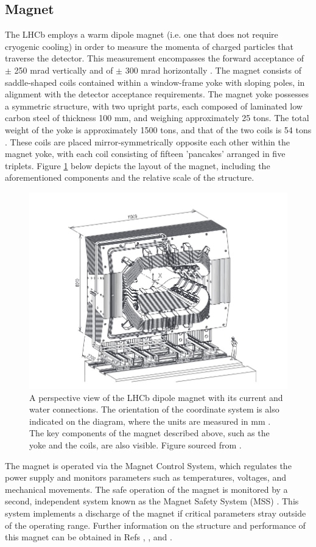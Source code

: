 \subsection{Magnet} 
The LHCb employs a warm dipole magnet (i.e. one that does not require cryogenic cooling) in order to measure the momenta of charged particles that traverse the detector. This measurement encompasses the forward acceptance of $\pm$ 250 mrad vertically and of $\pm$ 300 mrad horizontally \cite{Amato:424338}.
The magnet consists of saddle-shaped coils contained within a window-frame yoke with sloping poles, in alignment with the detector acceptance requirements. The magnet yoke possesses a symmetric structure, with two upright parts, each composed of laminated low carbon steel of thickness
100 mm, and weighing approximately 25 tons. The total weight of the yoke is approximately 1500 tons, and that of the two coils is 54 tons \cite{1018421}. These coils are placed mirror-symmetrically opposite each other within the magnet yoke, with each coil consisting of fifteen 'pancakes' arranged in five triplets.
Figure \ref{Magnet_image} below depicts the layout of the magnet, including the aforementioned components and the relative scale of the structure.
\begin{figure}[H]
    \centering
    \includegraphics[scale=0.6]{Magnet_image.jpg}
    \caption{A perspective view of the LHCb dipole magnet with its current and water connections. The orientation of the coordinate system is also indicated on the diagram, where the units are measured in mm \cite{1018421}. The key components of the magnet described above, such as the yoke and the coils, are also visible. Figure sourced from \cite{1018421}.}
    \label{Magnet_image}
\end{figure}
The magnet is operated via the Magnet Control System, which regulates the power supply and monitors parameters such as temperatures, voltages, and mechanical movements. The safe operation of the magnet is monitored by a second, independent system known as the Magnet Safety System (MSS) \cite{1324843}. This system implements a discharge of the magnet if critical parameters stray outside of the operating range.
Further information on the structure and performance of this magnet can be obtained in Refs \cite{Amato:424338}, \cite{1018421}, and \cite{1324843}.

